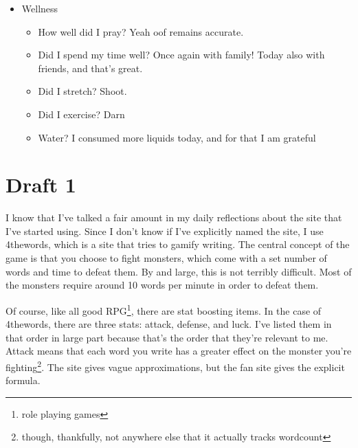 \documentclass[12pt]{article}[titlepage]
\renewcommand{\,}{\textsuperscript{,}}
\begin{document}
\begin{itemize}
\begin{itemize}
\item Did I revise a sonnet? Somehow when I'm tired I write sonnets thoughtlessly. That's probably because I don't care if the rhyme feels forced or if the story makes no sense.
\item Did I blog? Hooray!
\item Did I write ahead on Jeb? I'm about one third through tomorrow's chapter, so will try to do more in the next few hours.
\item Letter to friends? I played real life pathfinder with some friends\footnote{could have mused on that, I suppose}, and I got coffee with a dear friend!
\item Paper? I was grateful not to be an experimentalist today.
\end{itemize}
\item Wellness
\begin{itemize}
\item How well did I pray? Yeah oof remains accurate.
\item Did I spend my time well? Once again with family! Today also with friends, and that's great.
\item Did I stretch? Shoot.
\item Did I exercise? Darn
\item Water? I consumed more liquids today, and for that I am grateful
\end{itemize}
\end{itemize}

\section{Draft 1}
I know that I've talked a fair amount in my daily reflections about the site that I've started using.
Since I don't know if I've explicitly named the site, I use 4thewords, which is a site that tries to gamify writing.
The central concept of the game is that you choose to fight monsters, which come with a set number of words and time to defeat them.
By and large, this is not terribly difficult.
Most of the monsters require around 10 words per minute in order to defeat them.

Of course, like all good RPG\footnote{role playing games}, there are stat boosting items.
In the case of 4thewords, there are three stats: attack, defense, and luck.
I've listed them in that order in large part because that's the order that they're relevant to me.
Attack means that each word you write has a greater effect on the monster you're fighting\footnote{though, thankfully, not anywhere else that it actually tracks wordcount}.
The site gives vague approximations, but the fan site gives the explicit formula.
\end{document}
